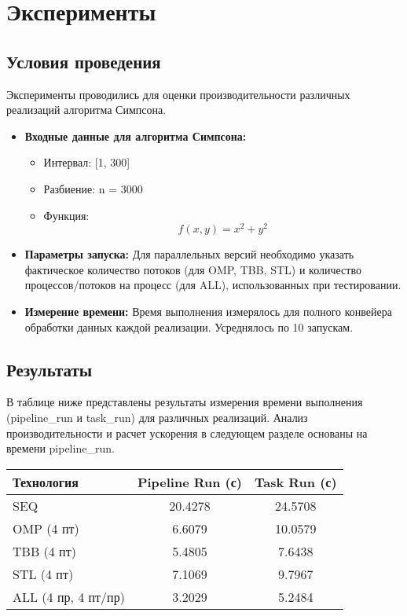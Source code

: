 \documentclass[12pt]{article}
\begin{document}
\newpage
\section{Эксперименты}
\subsection{Условия проведения}
Эксперименты проводились для оценки производительности различных реализаций алгоритма Симпсона.
\begin{itemize}
    \item \textbf{Входные данные для алгоритма Симпсона:}
        \begin{itemize}
            \item Интервал: [1, 300]
            \item Разбиение: n = 3000
            \item Функция: \[ f(x, y) = x^2 + y^2 \]
        \end{itemize}

    \item \textbf{Параметры запуска:} Для параллельных версий необходимо указать фактическое количество потоков (для OMP, TBB, STL) и количество процессов/потоков на процесс (для ALL), использованных при тестировании.
    \item \textbf{Измерение времени:} Время выполнения измерялось для полного конвейера обработки данных каждой реализации. Усреднялось по 10 запускам.
\end{itemize}

\subsection{Результаты}
В таблице ниже представлены результаты измерения времени выполнения (pipeline\_run и task\_run) для различных реализаций. Анализ производительности и расчет ускорения в следующем разделе основаны на времени pipeline\_run.

\begin{center}
\begin{tabular}{|l|c|c|}
\hline
\textbf{Технология} & \textbf{Pipeline Run (с)} & \textbf{Task Run (с)} \\
\hline
SEQ                    & 20.4278           & 24.5708       \\
\hline
OMP (4 пт)             & 6.6079           & 10.0579       \\
\hline
TBB (4 пт)             & 5.4805           & 7.6438       \\
\hline
STL (4 пт)             & 7.1069           & 9.7967        \\
\hline
ALL (4 пр, 4 пт/пр)    & 3.2029           & 5.2484       \\
\hline
\end{tabular}
\end{center}
\end{document}
